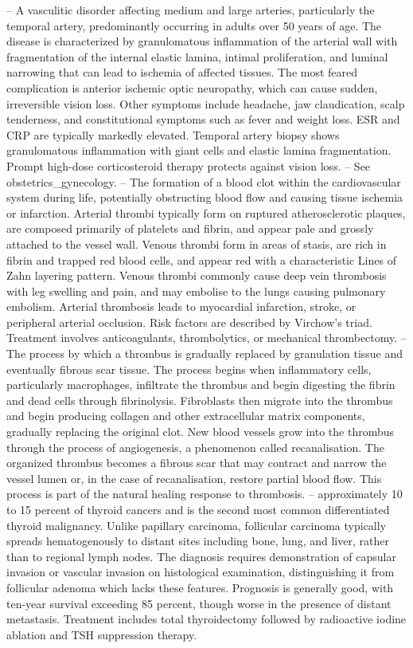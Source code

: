 -- A vasculitic disorder affecting medium and large arteries, particularly the temporal artery, predominantly occurring in adults over 50 years of age. The disease is characterized by granulomatous inflammation of the arterial wall with fragmentation of the internal elastic lamina, intimal proliferation, and luminal narrowing that can lead to ischemia of affected tissues. The most feared complication is anterior ischemic optic neuropathy, which can cause sudden, irreversible vision loss. Other symptoms include headache, jaw claudication, scalp tenderness, and constitutional symptoms such as fever and weight loss. ESR and CRP are typically markedly elevated. Temporal artery biopsy shows granulomatous inflammation with giant cells and elastic lamina fragmentation. Prompt high-dose corticosteroid therapy protects against vision loss.
-- See obstetrics\_gynecology.
-- The formation of a blood clot within the cardiovascular system during life, potentially obstructing blood flow and causing tissue ischemia or infarction. Arterial thrombi typically form on ruptured atherosclerotic plaques, are composed primarily of platelets and fibrin, and appear pale and grossly attached to the vessel wall. Venous thrombi form in areas of stasis, are rich in fibrin and trapped red blood cells, and appear red with a characteristic Lines of Zahn layering pattern. Venous thrombi commonly cause deep vein thrombosis with leg swelling and pain, and may embolise to the lungs causing pulmonary embolism. Arterial thrombosis leads to myocardial infarction, stroke, or peripheral arterial occlusion. Risk factors are described by Virchow's triad. Treatment involves anticoagulants, thrombolytics, or mechanical thrombectomy.
-- The process by which a thrombus is gradually replaced by granulation tissue and eventually fibrous scar tissue. The process begins when inflammatory cells, particularly macrophages, infiltrate the thrombus and begin digesting the fibrin and dead cells through fibrinolysis. Fibroblasts then migrate into the thrombus and begin producing collagen and other extracellular matrix components, gradually replacing the original clot. New blood vessels grow into the thrombus through the process of angiogenesis, a phenomenon called recanalisation. The organized thrombus becomes a fibrous scar that may contract and narrow the vessel lumen or, in the case of recanalisation, restore partial blood flow. This process is part of the natural healing response to thrombosis.
-- approximately 10 to 15 percent of thyroid cancers and is the second most common differentiated thyroid malignancy. Unlike papillary carcinoma, follicular carcinoma typically spreads hematogenously to distant sites including bone, lung, and liver, rather than to regional lymph nodes. The diagnosis requires demonstration of capsular invasion or vascular invasion on histological examination, distinguishing it from follicular adenoma which lacks these features. Prognosis is generally good, with ten-year survival exceeding 85 percent, though worse in the presence of distant metastasis. Treatment includes total thyroidectomy followed by radioactive iodine ablation and TSH suppression therapy.

